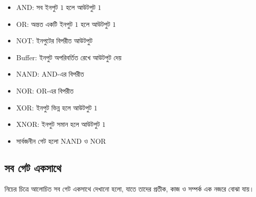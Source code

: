 \begin{itemize}[label={{\bulletfont\textbullet}}, leftmargin=*, nosep]
    \item \textenglish{AND}: সব ইনপুট \(1\) হলে আউটপুট \(1\)
    \item \textenglish{OR}: অন্তত একটি ইনপুট \(1\) হলে আউটপুট \(1\)
    \item \textenglish{NOT}: ইনপুটের বিপরীত আউটপুট
    \item \textenglish{Buffer}: ইনপুট অপরিবর্তিত রেখে আউটপুট দেয়
    \item \textenglish{NAND}: \textenglish{AND}-এর বিপরীত
    \item \textenglish{NOR}: \textenglish{OR}-এর বিপরীত
    \item \textenglish{XOR}: ইনপুট ভিন্ন হলে আউটপুট \(1\)
    \item \textenglish{XNOR}: ইনপুট সমান হলে আউটপুট \(1\)
    \item সার্বজনীন গেট হলো \textenglish{NAND} ও \textenglish{NOR}
\end{itemize}


\subsection{সব গেট একসাথে}

নিচের চিত্রে আলোচিত সব গেট একসাথে দেখানো হলো, যাতে তাদের প্রতীক, কাজ ও সম্পর্ক এক নজরে বোঝা যায়।






